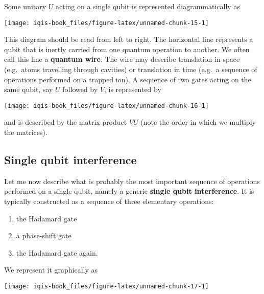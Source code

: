 \documentclass[fleqn]{article}
\providecommand{\tightlist}{%
  \setlength{\itemsep}{0pt}\setlength{\parskip}{0pt}}
\begin{document}
Some unitary \(U\) acting on a single qubit is represented diagrammatically as

\begin{center}\texttt{[image: iqis-book\_files/figure-latex/unnamed-chunk-15-1]} \end{center}

This diagram should be read from left to right.
The horizontal line represents a qubit that is inertly carried from one quantum operation to another.
We often call this line a \textbf{quantum wire}.
The wire may describe translation in space (e.g.~atoms travelling through cavities) or translation in time (e.g.~a sequence of operations performed on a trapped ion).
A sequence of two gates acting on the same qubit, say \(U\) followed by \(V\), is represented by

\begin{center}\texttt{[image: iqis-book\_files/figure-latex/unnamed-chunk-16-1]} \end{center}

and is described by the matrix product \(VU\) (note the order in which we multiply the matrices).

\hypertarget{single-qubit-interference}{%
\subsection{Single qubit interference}\label{single-qubit-interference}}

Let me now describe what is probably the most important sequence of operations performed on a single qubit, namely a generic \textbf{single qubit interference}.
It is typically constructed as a sequence of three elementary operations:

\begin{enumerate}
\def\labelenumi{\arabic{enumi}.}
\tightlist
\item
  the Hadamard gate
\item
  a phase-shift gate
\item
  the Hadamard gate again.
\end{enumerate}

We represent it graphically as

\begin{center}\texttt{[image: iqis-book\_files/figure-latex/unnamed-chunk-17-1]} \end{center}
\end{document}
